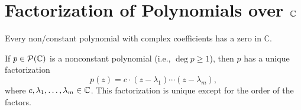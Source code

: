 \section{Factorization of Polynomials over \texorpdfstring{$\mathbb{C}$}{C}}
\setcounter{thm}{11}
\begin{thm}
  \label{fundamental-theorem-of-algebra-first-version}
  Every non\-/constant polynomial with complex coefficients has a zero in $\mathbb{C}$.
\end{thm}

\begin{thm} 
  \label{fundamental-theorem-of-algebra-second-version}
  If $p \in \mathcal{P}(\mathbb{C})$ is a nonconstant polynomial (i.e., $\deg p \geq 1$), then $p$ has a unique factorization
  \begin{equation}
  	p(z)=c \cdot (z-\lambda_1) \cdots (z-\lambda_m),
  \end{equation}
  where $c, \lambda_1, \dots, \lambda_m \in \mathbb{C}$. This factorization is unique except for the order of the factors.
\end{thm}
